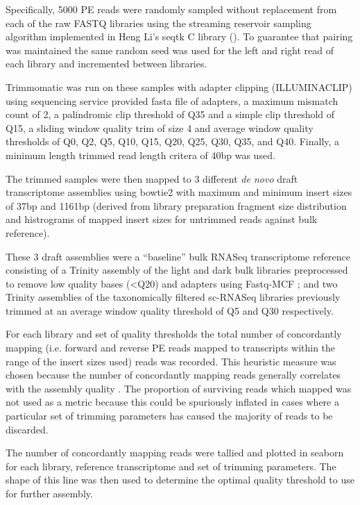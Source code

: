 Specifically, 5000 PE reads were randomly sampled without replacement from each of the raw FASTQ libraries 
using the streaming reservoir sampling \citep{Vitter1985} algorithm implemented in Heng Li's 
seqtk C library (\citep{SeqtkGitHub}).
To guarantee that pairing was maintained the same random seed was used for the left and right read
of each library and incremented between libraries.

Trimmomatic \citep{Bolger2014a} was run on these samples with adapter clipping (ILLUMINACLIP)
using sequencing service provided fasta file of adapters, a maximum mismatch count of 2,
a palindromic clip threshold of Q35 and a simple clip threshold of Q15, a sliding window
quality trim of size 4 and average window quality thresholds of Q0, Q2, Q5, Q10, Q15, Q20, Q25, Q30, Q35, and Q40.
Finally, a minimum length trimmed read length critera of 40bp was used.  


The trimmed samples were then mapped to 3 different \textit{de novo} draft transcriptome assemblies using bowtie2
\citep{Langmead2012} with maximum and minimum insert sizes of 37bp and 1161bp (derived from library preparation
fragment size distribution and histrograms of mapped insert sizes for untrimmed reads against bulk reference).

These 3 draft assemblies were a ``baseline'' bulk RNASeq transcriptome reference consisting of a Trinity \citep{Haas2013} 
assembly of the light and dark bulk libraries preprocessed to remove low quality bases (<Q20) and adapters using Fastq-MCF \citep{Aronesty2013};
and two Trinity assemblies of the taxonomically filtered sc-RNASeq libraries previously trimmed 
at an average window quality threshold of Q5 and Q30 respectively.


For each library and set of quality thresholds the total number of concordantly
mapping (i.e. forward and reverse PE reads mapped to transcripts within the range of the insert sizes used)
reads was recorded.  This heuristic measure was chosen because the number of concordantly mapping reads generally correlates
with the assembly quality \citep{Macmanes2014}. The proportion of surviving reads which mapped 
was not used as a metric because this could be spuriously inflated in cases where a particular
set of trimming parameters has caused the majority of reads to be discarded.

The number of concordantly mapping reads were tallied and plotted in seaborn 
for each library, reference transcriptome and set of trimming parameters.
The shape of this line was then used to determine the optimal quality 
threshold to use for further assembly.

